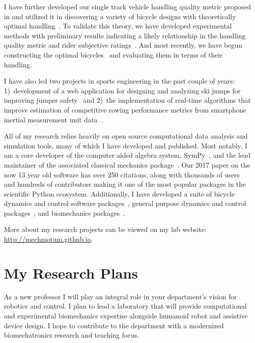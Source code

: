 \documentclass{article}
\begin{document}
I have further developed our single track vehicle handling quality metric
proposed in \cite{Hess2012} and utilized it in discovering a variety of bicycle
designs with theoretically optimal handling~\cite{Moore2016,Moore2019a}. To
validate this theory, we have developed experimental methods with preliminary
results indicating a likely relationship in the handling quality metric and
rider subjective ratings~\cite{Kresie2017}. And most recently, we have begun
constructing the optimal bicycles~\cite{Gilboa2019a} and evaluating them in
terms of their handling.

I have also led two projects in sports engineering in the past couple of years:
1)~development of a web application for designing and analyzing ski jumps for
improving jumper safety~\cite{Moore2018a,Cloud2019a} and 2)~the implementation
of real-time algorithms that improve estimation of competitive rowing
performance metrics from smartphone inertial measurement unit
data~\cite{Cloud2019b}.

All of my research relies heavily on open source computational data analysis
and simulation tools, many of which I have developed and published. Most
notably, I am a core developer of the computer aided algebra system,
SymPy~\cite{SymPyDevelopmentTeam2006}, and the lead maintainer of the
associated classical mechanics package~\cite{Gede2013}. Our 2017 paper
\cite{Meurer2017} on the now 13 year old software has over 250 citations, along
with thousands of users and hundreds of contributors making it one of the most
popular packages in the scientific Python ecosystem. Additionally, I have
developed a suite of bicycle dynamics and control software
packages~\cite{Moore2010b,Moore2011d,Moore2011a,Moore2011e}, general purpose
dynamics and control packages~\cite{Moore2014,Moore2011}, and biomechanics
packages~\cite{Dembia2011,Moore2011,Moore2011b,Moore2013b}.

More about my research projects can be viewed on my lab website:
\url{http://mechmotum.github.io}.

\section*{My Research Plans%
  \label{my-research-plans}%
}

As a new professor I will play an integral role in your department's vision for
robotics and control. I plan to lead a laboratory that will provide
computational and experimental biomechanics expertise alongside humanoid robot
and assistive device design. I hope to contribute to the department with a
modernized biomechatronics research and teaching focus.
\end{document}
